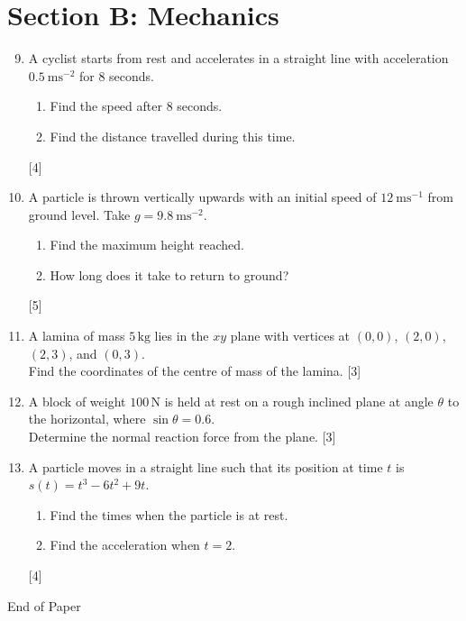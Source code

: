 \documentclass[a4paper,12pt]{article}
\begin{document}

\section*{Section B: Mechanics}

\begin{enumerate}
    \setcounter{enumi}{8}
    \item A cyclist starts from rest and accelerates in a straight line with acceleration $ 0.5\ \mathrm{ms}^{-2} $ for 8 seconds.
    \begin{enumerate}
        \item Find the speed after 8 seconds.
        \item Find the distance travelled during this time.
    \end{enumerate}
    \hfill [4]
    \vspace{0.5cm}
    
    \item A particle is thrown vertically upwards with an initial speed of $ 12\ \mathrm{ms}^{-1} $ from ground level. Take $ g = 9.8\ \mathrm{ms}^{-2} $.
    \begin{enumerate}
        \item Find the maximum height reached.
        \item How long does it take to return to ground?
    \end{enumerate}
    \hfill [5]
    \vspace{0.5cm}
    
    \item A lamina of mass $ 5\,\mathrm{kg} $ lies in the $ xy $ plane with vertices at $ (0,0) $, $ (2,0) $, $ (2,3) $, and $ (0,3) $.
    \\Find the coordinates of the centre of mass of the lamina.
    \hfill [3]
    \vspace{0.5cm}
    
    \item A block of weight $ 100\,\mathrm{N} $ is held at rest on a rough inclined plane at angle $ \theta $ to the horizontal, where $ \sin\theta = 0.6 $.\\
    Determine the normal reaction force from the plane.
    \hfill [3]
    \vspace{0.5cm}
    
    \item A particle moves in a straight line such that its position at time $ t $ is $ s(t) = t^3 - 6t^2 + 9t $.
    \begin{enumerate}
        \item Find the times when the particle is at rest.
        \item Find the acceleration when $ t = 2 $.
    \end{enumerate}
    \hfill [4]
    \vspace{0.5cm}
\end{enumerate}

\vspace{2cm}
\begin{center}
    {\large End of Paper}
\end{center}
\end{document}
